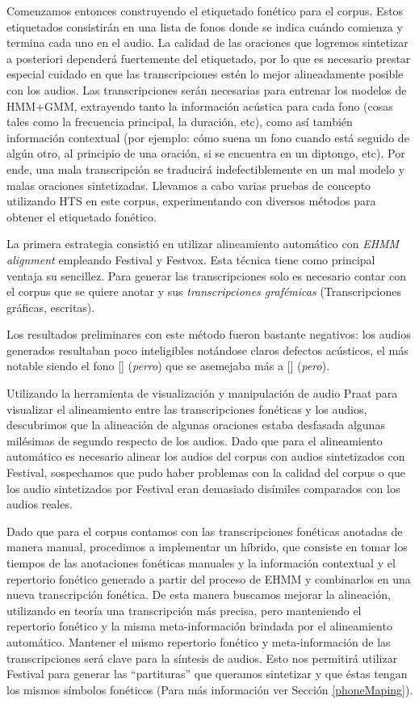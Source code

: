 Comenzamos entonces construyendo el etiquetado fonético para el corpus. Estos etiquetados consistirán en una lista de fonos donde se indica cuándo comienza y termina cada uno en el audio. La calidad de las oraciones que logremos sintetizar a posteriori dependerá fuertemente del etiquetado, por lo que es necesario prestar especial cuidado en que las transcripciones estén lo mejor alineadamente posible con los audios. Las transcripciones serán necesarias para entrenar los modelos de HMM+GMM, extrayendo tanto la información acústica para cada fono (cosas tales como la frecuencia principal, la duración, etc), como así también información contextual (por ejemplo: cómo suena un fono cuando está seguido de algún otro, al principio de una oración, si se encuentra en un diptongo, etc). Por ende, una mala transcripción se traducirá indefectiblemente en un mal modelo y malas oraciones sintetizadas. Llevamos a cabo varias pruebas de concepto utilizando HTS en este corpus, experimentando con diversos métodos para obtener el etiquetado fonético. 

La primera estrategia consistió en utilizar alineamiento automático con \textit{EHMM alignment} \cite{phoneticCapturing} empleando Festival y Festvox. Esta técnica tiene como principal ventaja su sencillez. Para generar las transcripciones solo es necesario contar con el corpus que se quiere anotar y sus \textit{transcripciones grafémicas} (Transcripciones gráficas, escritas).

Los resultados preliminares con este método fueron bastante negativos: los audios generados resultaban poco inteligibles notándose claros defectos acústicos, el más notable siendo el fono [] (\textit{perro}) que se asemejaba más a [] (\textit{pero}).

Utilizando la herramienta de visualización y manipulación de audio Praat \cite{praat} para visualizar el alineamiento entre las transcripciones fonéticas y los audios, descubrimos que la alineación de algunas oraciones estaba desfasada algunas milésimas de segundo respecto de los audios. Dado que para el alineamiento automático es necesario alinear los audios del corpus con audios sintetizados con Festival, sospechamos que pudo haber problemas con la calidad del corpus o que los audio sintetizados por Festival eran demasiado disímiles comparados con los audios reales. 

Dado que para el corpus contamos con las transcripciones fonéticas anotadas de manera manual, procedimos a implementar un híbrido, que consiste en tomar los tiempos de las anotaciones fonéticas manuales y la información contextual y el repertorio fonético generado a partir del proceso de EHMM y combinarlos en una nueva transcripción fonética. De esta manera buscamos mejorar la alineación, utilizando en teoría una transcripción más precisa, pero manteniendo el repertorio fonético y la misma meta-información brindada por el alineamiento automático. Mantener el mismo repertorio fonético y meta-información de las transcripciones será clave para la síntesis de audios. Esto nos permitirá utilizar Festival para generar las ``partituras'' que queramos sintetizar y que éstas tengan los mismos símbolos fonéticos (Para más información ver Sección \ref{phoneMaping}).

